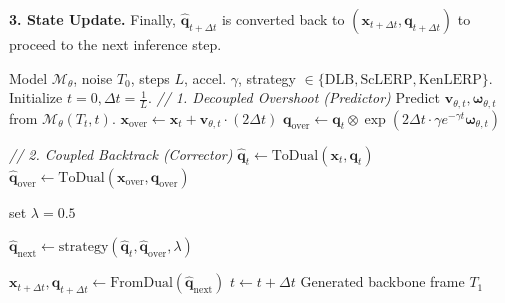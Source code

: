 \documentclass[a4paper,11pt]{article}
\begin{document}
\textbf{3. State Update.}
Finally, $\hat{\bm{q}}_{t+\Delta t}$ is converted back to $(\bm{x}_{t+\Delta t}, \bm{q}_{t+\Delta t})$ to proceed to the next inference step.

\begin{algorithm}[h]
\caption{Overshoot-Backtrack Inference with Generic Interpolation}
\label{alg:overshoot_generic}
\begin{algorithmic}[1]
\REQUIRE Model $\mathcal{M}_\theta$, noise $T_0$, steps $L$, accel. $\gamma$, strategy $\in \{\text{DLB}, \text{ScLERP}, \text{KenLERP}\}$.
\STATE Initialize $t = 0, \Delta t = \frac{1}{L}$.
    \STATE \textit{// 1. Decoupled Overshoot (Predictor)}
    \STATE Predict $\bm{v}_{\theta,t}, \bm{\omega}_{\theta,t}$ from $\mathcal{M}_\theta(T_t, t)$.
    \STATE $\bm{x}_{\text{over}} \leftarrow \bm{x}_t + \bm{v}_{\theta,t} \cdot (2\Delta t)$
    \STATE $\bm{q}_{\text{over}} \leftarrow \bm{q}_t \otimes \exp\left(2\Delta t \cdot \gamma e^{-\gamma t} \bm{\omega}_{\theta,t}\right)$
    
    \STATE \textit{// 2. Coupled Backtrack (Corrector)}
    \STATE $\hat{\bm{q}}_t \leftarrow \text{ToDual}(\bm{x}_t, \bm{q}_t)$
    \STATE $\hat{\bm{q}}_{\text{over}} \leftarrow \text{ToDual}(\bm{x}_{\text{over}}, \bm{q}_{\text{over}})$
    
    \STATE set $\lambda=0.5$

    \STATE $\hat{\bm{q}}_{\text{next}} \leftarrow \text{strategy}(\hat{\bm{q}}_t, \hat{\bm{q}}_{\text{over}}, \lambda)$

    
    \STATE $\bm{x}_{t+\Delta t}, \bm{q}_{t+\Delta t} \leftarrow \text{FromDual}(\hat{\bm{q}}_{\text{next}})$
    \STATE $t \leftarrow t + \Delta t$
\ENDFOR
\RETURN Generated backbone frame $T_1$
\end{algorithmic}
\end{algorithm}
\end{document}
